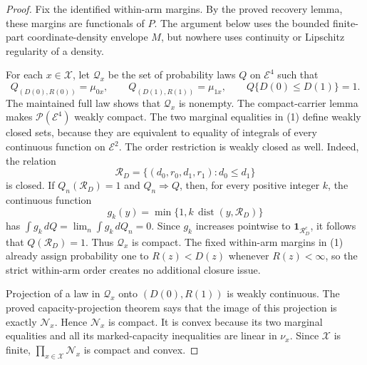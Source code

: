 \documentclass{article}
\begin{document}
\begin{proof}
Fix the identified within-arm margins.  By the proved recovery lemma, these margins are functionals of \(P\).  The argument below uses the bounded finite-part coordinate-density envelope \(M\), but nowhere uses continuity or Lipschitz regularity of a density.

For each \(x\in\mathcal X\), let \(\mathcal Q_x\) be the set of probability laws \(Q\) on \(\mathcal E^4\) such that
\[
 Q_{(D(0),R(0))}=\mu_{0x},\qquad
 Q_{(D(1),R(1))}=\mu_{1x},\qquad
 Q\{D(0)\leq D(1)\}=1. \tag{1}
\]
The maintained full law shows that \(\mathcal Q_x\) is nonempty.  The compact-carrier lemma makes \(\mathcal P(\mathcal E^4)\) weakly compact.  The two marginal equalities in (1) define weakly closed sets, because they are equivalent to equality of integrals of every continuous function on \(\mathcal E^2\).  The order restriction is weakly closed as well.  Indeed, the relation
\[
 \mathcal R_D=\{(d_0,r_0,d_1,r_1):d_0\leq d_1\}
\]
is closed.  If \(Q_n(\mathcal R_D)=1\) and \(Q_n\Rightarrow Q\), then, for every positive integer \(k\), the continuous function
\[
 g_k(y)=\min\{1,k\,\operatorname{dist}(y,\mathcal R_D)\}
\]
has \(\int g_k\,dQ=\lim_n\int g_k\,dQ_n=0\).  Since \(g_k\) increases pointwise to \(\mathbf 1_{\mathcal R_D^c}\), it follows that \(Q(\mathcal R_D)=1\).  Thus \(\mathcal Q_x\) is compact.  The fixed within-arm margins in (1) already assign probability one to \(R(z)<D(z)\) whenever \(R(z)<\infty\), so the strict within-arm order creates no additional closure issue.

Projection of a law in \(\mathcal Q_x\) onto \((D(0),R(1))\) is weakly continuous.  The proved capacity-projection theorem says that the image of this projection is exactly \(\mathcal N_x\).  Hence \(\mathcal N_x\) is compact.  It is convex because its two marginal equalities and all its marked-capacity inequalities are linear in \(\nu_x\).  Since \(\mathcal X\) is finite, \(\prod_{x\in\mathcal X}\mathcal N_x\) is compact and convex.


\end{proof}
\end{document}
